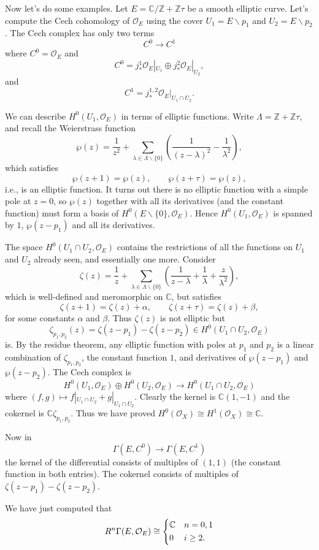\documentclass[12pt]{article}
\theoremstyle{plain}
\theoremstyle{definition}
\numberwithin{equation}{section}
\newcommand{\al}{\alpha}
\newcommand{\la}{\lambda}
\newcommand{\La}{\Lambda}
\newcommand{\C}{\mathbb{C}}
\newcommand{\Z}{\mathbb{Z}}
\newcommand{\OO}{\mathcal{O}}
\begin{document}
Now let's do some examples. Let $E = \C / \Z + \Z \tau$ be a smooth elliptic curve. Let's compute the Cech cohomology of $\OO_E$ using the cover $U_1 = E \backslash p_1$ and $U_2 = E \backslash p_2$. The Cech complex has only two terms
\[
C^0 \rightarrow C^1
\]
where $C^0 = \OO_E$ and
\[
C^0 = j^1_* {\OO_E}|_{U_1} \oplus j^2_* {\OO_E}|_{U_2},
\]
and
\[
C^1 = j^{1, 2}_* {\OO_E}|_{U_1 \cap U_2}.
\]

We can describe $H^0(U_1, \OO_E)$ in terms of elliptic functions. Write $\La = \Z + \Z \tau$, and recall the Weierstrass function
\[
\wp(z) = \frac{1}{z^2} + \sum_{\la \in \La \backslash \{0\}} \left( \frac{1}{(z-\la)^2} - \frac{1}{\la^2} \right),
\]
which satisfies
\[
\wp(z+1)=\wp(z), \qquad \wp(z+\tau)=\wp(z),
\]
i.e., is an elliptic function. It turns out there is no elliptic function with a simple pole at $z=0$, so $\wp(z)$ together with all its derivatives (and the constant function) must form a basis of $H^0(E \backslash \{0\}, \OO_E)$. Hence $H^0(U_1, \OO_E)$ is spanned by $1$, $\wp(z-p_1)$ and all its derivatives.

The space $H^0(U_1 \cap U_2, \OO_E)$ contains the restrictions of all the functions on $U_1$ and $U_2$ already seen, and essentially one more. Consider
\[
\zeta(z) = \frac{1}{z} + \sum_{\la \in \La \backslash \{0\}} \left( \frac{1}{z-\la} + \frac{1}{\la} + \frac{z}{\la^2} \right),
\]
which is well-defined and meromorphic on $\C$, but satisfies
\[
\zeta(z+1)=\zeta(z)+\alpha, \qquad \zeta(z+\tau)=\zeta(z)+\beta,
\]
for some constants $\al$ and $\beta$. Thus $\zeta(z)$ is not elliptic but
\[
\zeta_{p_1, p_2}(z) = \zeta(z-p_1)-\zeta(z-p_2) \in H^0(U_1 \cap U_2, \OO_E)
\]
is. By the residue theorem, any elliptic function with poles at $p_1$ and $p_2$ is a linear combination of $\zeta_{p_1, p_2}$, the constant function $1$, and derivatives of $\wp(z-p_1)$ and $\wp(z-p_2)$. The Cech complex is
\[
H^0(U_1, \OO_E) \oplus H^0(U_2, \OO_E) \rightarrow H^0(U_1 \cap U_2, \OO_E)
\]
where $(f, g) \mapsto f|_{U_1 \cap U_2} + g|_{U_1 \cap U_2}$. Clearly the kernel is $\C(1, -1)$ and the cokernel is $\C \zeta_{p_1, p_2}$. Thus we have proved $H^0(\OO_X) \cong H^1(\OO_X) \cong \C$.

Now in
\[
\Gamma(E, C^0) \rightarrow \Gamma(E, C^1)
\]
the kernel of the differential consists of multiples of $(1, 1)$ (the constant function in both entries). The cokernel consists of multiples of $\zeta(z-p_1) - \zeta(z-p_2)$.

We have just computed that
\[
R^n\Gamma(E, \OO_E) \cong \begin{dcases}
\C & n=0,1 \\
0 & i \geq 2.
\end{dcases}
\]
\end{document}
